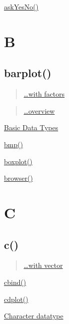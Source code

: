 \documentclass[]{book}
\begin{document}
\href{linkedin-learning.pxf.io/rweekly_askyesno}{askYesNo()}

\hypertarget{b}{%
\chapter*{B}\label{b}}

\hypertarget{barplot}{%
\section*{barplot()}\label{barplot}}

\begin{quote}
\href{https://linkedin-learning.pxf.io/rweekly_factor}{\ldots{}with factors}
\end{quote}

\begin{quote}
\href{https://linkedin-learning.pxf.io/rweekly_barplot}{\ldots{}overview}
\end{quote}

\href{https://linkedin-learning.pxf.io/rweekly_atomics}{Basic Data Types}

\href{linkedin-learning.pxf.io/rweekly_plottofile}{bmp()}

\href{https://linkedin-learning.pxf.io/rweekly_boxplot}{boxplot()}

\href{https://linkedin-learning.pxf.io/rweekly_browser}{browser()}

\hypertarget{c}{%
\chapter*{C}\label{c}}

\hypertarget{c-1}{%
\section*{c()}\label{c-1}}

\begin{quote}
\href{https://linkedin-learning.pxf.io/rwkly_vector}{\ldots{}with vector}
\end{quote}

\href{https://linkedin-learning.pxf.io/rweekly_cbind}{cbind()}

\href{https://linkedin-learning.pxf.io/rweekly_cdplot}{cdplot()}

\href{https://linkedin-learning.pxf.io/rweekly_atomics}{Character datatype}
\end{document}
